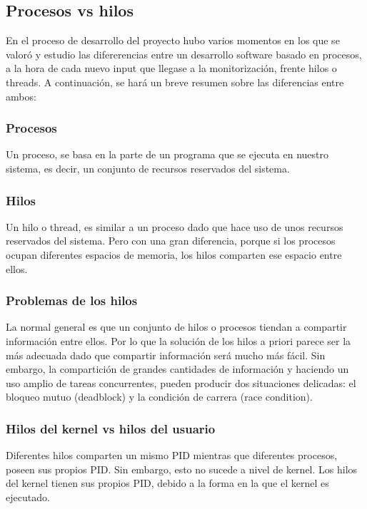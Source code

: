 \subsection{Procesos vs hilos}

En el proceso de desarrollo del proyecto hubo varios momentos en los que se valoró y estudio las difererencias entre un desarrollo software basado en procesos, a la hora de cada nuevo input que llegase a la monitorización, frente hilos o threads. A continuación, se hará un breve resumen sobre las diferencias entre ambos:

\subsubsection{Procesos}

Un proceso, se basa en la parte de un programa que se ejecuta en nuestro sistema, es decir, un conjunto de recursos reservados del sistema.

\subsubsection{Hilos}

Un hilo o thread, es similar a un proceso dado que hace uso de unos recursos reservados del sistema. Pero con una gran diferencia, porque si los procesos ocupan diferentes espacios de memoria, los hilos comparten ese espacio entre ellos.

\subsubsection{Problemas de los hilos}

La normal general es que un conjunto de hilos o procesos tiendan a compartir información entre ellos. Por lo que la solución de los hilos a priori parece ser la más adecuada dado que compartir información será mucho más fácil. Sin embargo, la compartición de grandes cantidades de información y haciendo un uso amplio de tareas concurrentes, pueden producir dos situaciones delicadas: el bloqueo mutuo (deadblock) y la condición de carrera (race condition).\\

\subsubsection{Hilos del kernel vs hilos del usuario}

Diferentes hilos comparten un mismo PID mientras que diferentes procesos, poseen sus propios PID. Sin embargo, esto no sucede a nivel de kernel. Los hilos del kernel tienen sus propios PID, debido a la forma en la que el kernel es ejecutado.\\

